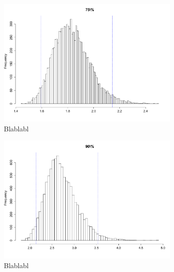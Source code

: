 \documentclass{article}
\renewcommand*{\(}{\left(}
\renewcommand*{\)}{\right)}
\begin{document}
\begin{figure}[H]
    \centering
    \begin{subfigure}[b]{0.3\textwidth}
        \includegraphics[width = \linewidth]{img/BootstrapParamEMV-75-100.pdf}
        \caption{Blablabl}
        \label{fig:BPEMV75} %
    \end{subfigure}%
    \begin{subfigure}[b]{0.3\textwidth}
        \includegraphics[width = \linewidth]{img/BootstrapParamEMV-90-100.pdf}
        \caption{Blablabl}
        \label{fig:BPEMV90}
    \end{subfigure}%
    \begin{subfigure}[b]{0.3\textwidth}

\end{subfigure}
\end{figure}
\end{document}
